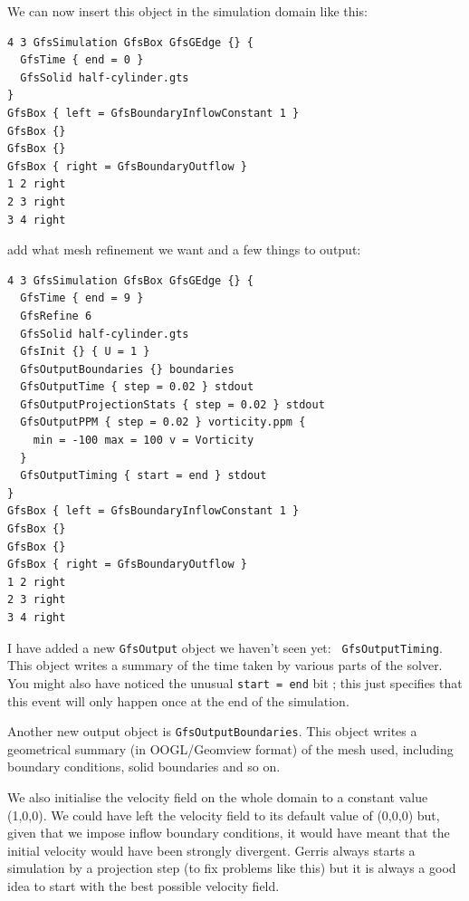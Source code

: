 \documentclass[a4paper]{article}
\begin{document}
We can now insert this object in the simulation domain like this:
\begin{verbatim}
4 3 GfsSimulation GfsBox GfsGEdge {} {
  GfsTime { end = 0 }
  GfsSolid half-cylinder.gts
}
GfsBox { left = GfsBoundaryInflowConstant 1 }
GfsBox {}
GfsBox {}
GfsBox { right = GfsBoundaryOutflow }
1 2 right
2 3 right
3 4 right
\end{verbatim}
add what mesh refinement we want and a few things to output:
\begin{verbatim}
4 3 GfsSimulation GfsBox GfsGEdge {} {
  GfsTime { end = 9 }
  GfsRefine 6
  GfsSolid half-cylinder.gts
  GfsInit {} { U = 1 }
  GfsOutputBoundaries {} boundaries
  GfsOutputTime { step = 0.02 } stdout
  GfsOutputProjectionStats { step = 0.02 } stdout
  GfsOutputPPM { step = 0.02 } vorticity.ppm { 
    min = -100 max = 100 v = Vorticity 
  }
  GfsOutputTiming { start = end } stdout
}
GfsBox { left = GfsBoundaryInflowConstant 1 }
GfsBox {}
GfsBox {}
GfsBox { right = GfsBoundaryOutflow }
1 2 right
2 3 right
3 4 right
\end{verbatim}
I have added a new {\tt GfsOutput} object we haven't seen yet: {\tt
GfsOutputTiming}. This object writes a summary of the time taken by
various parts of the solver. You might also have noticed the unusual
{\tt start = end} bit ; this just specifies that this event will only
happen once at the end of the simulation.

Another new output object is {\tt GfsOutputBoundaries}. This object
writes a geometrical summary (in {\sc OOGL}/Geomview format) of the mesh
used, including boundary conditions, solid boundaries and so on.

We also initialise the velocity field on the whole domain
to a constant value (1,0,0). We could have left the
velocity field to its default value of (0,0,0) but, given that we
impose inflow boundary conditions, it would have meant that the
initial velocity would have been strongly divergent. Gerris always
starts a simulation by a projection step (to fix problems like this)
but it is always a good idea to start with the best possible velocity
field.
\end{document}
